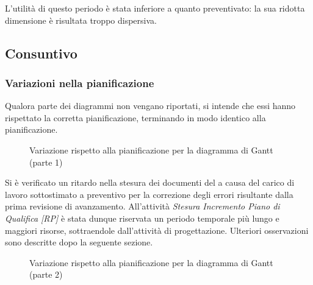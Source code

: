 L'utilità di questo periodo è stata inferiore a quanto preventivato: la sua ridotta dimensione è risultata troppo dispersiva.

\subsection{Consuntivo \PA}
\introconsuntivo{\PA}

\subsubsection{Variazioni nella pianificazione}

Qualora parte dei diagrammi non vengano riportati, si intende che essi hanno rispettato la corretta pianificazione, terminando in modo identico alla pianificazione.

\begin{figure}[H]
\label{tab:cgen1}

\caption{Variazione rispetto alla pianificazione per la \PA{} diagramma di Gantt (parte 1)}
\end{figure}

Si è verificato un ritardo nella stesura dei documenti del \PdQ{} a causa del carico di lavoro sottostimato a preventivo per la correzione degli errori risultante dalla prima revisione di avanzamento. All'attività \emph{Stesura Incremento Piano di Qualifica [RP]} è stata dunque riservata un periodo temporale più lungo e maggiori risorse, sottraendole dall'attività di progettazione. Ulteriori osservazioni sono descritte dopo la seguente sezione.


\begin{figure}[H]
\label{tab:cgen1}

\caption{Variazione rispetto alla pianificazione per la \PA{} diagramma di Gantt (parte 2)}
\end{figure}


